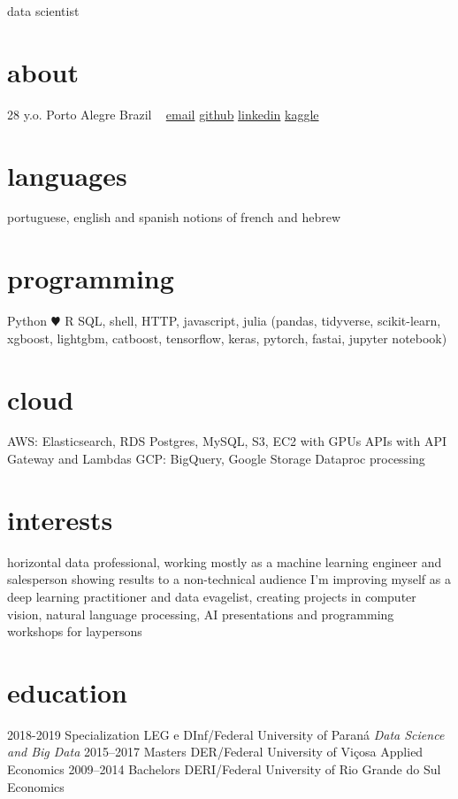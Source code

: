 \documentclass[]{friggeri-cv}
\begin{document}
       {data scientist}


\begin{aside}
  \section{about}
    28 y.o.
    Porto Alegre
    Brazil
    ~
    \href{mailto:jayme.anchante@disroot.com}{email}
    \href{https://github.com/jayme-anchante/}{github}
    \href{https://www.linkedin.com/in/jayme-anchante}{linkedin}
    \href{https://www.kaggle.com/jaymeanchante}{kaggle}
  \section{languages}
    portuguese, english and spanish
    notions of french and hebrew
  \section{programming}
    Python {\color{red} $\varheartsuit$} R
    SQL, shell, HTTP,
    javascript, julia
    (pandas, tidyverse,
    scikit-learn, xgboost,
    lightgbm, catboost,
    tensorflow, keras,
    pytorch, fastai,
    jupyter notebook)
  \section{cloud}
    AWS:
    Elasticsearch, RDS Postgres, MySQL,
    S3, EC2 with GPUs
    APIs with API Gateway and Lambdas
    GCP:
    BigQuery, Google Storage
    Dataproc processing
\end{aside}

\section{interests}

horizontal data professional, working mostly as a machine learning engineer and
salesperson showing results to a non-technical audience
I'm improving myself as a deep learning practitioner and data evagelist,
creating projects in computer vision, natural language processing,
AI presentations and programming workshops for laypersons

\section{education}

\begin{entrylist}
  \entry
    {2018-2019}
    {Specialization}
    {LEG e DInf/Federal University of Paraná}
    {\emph{Data Science and Big Data}}
  \entry
    {2015–2017}
    {Masters}
    {DER/Federal University of Viçosa}
    {Applied Economics}
  \entry
    {2009–2014}
    {Bachelors}
    {DERI/Federal University of Rio Grande do Sul}
    {Economics}
\end{entrylist}
\end{document}
